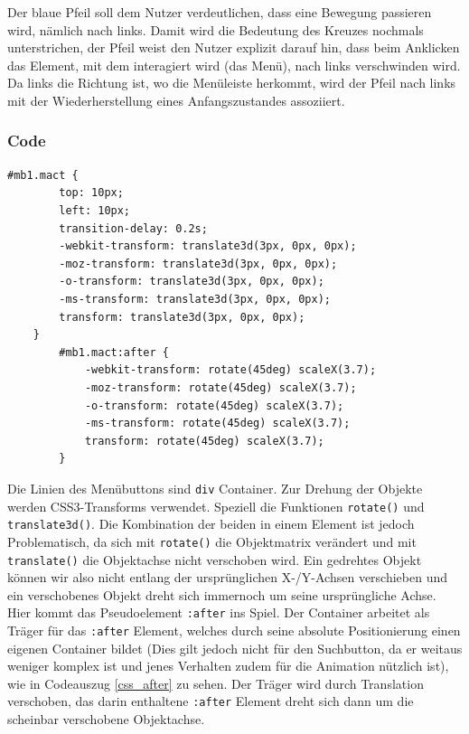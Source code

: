 Der blaue Pfeil soll dem Nutzer verdeutlichen, dass eine Bewegung passieren wird, nämlich nach links. Damit wird die Bedeutung des Kreuzes nochmals unterstrichen, der Pfeil weist den Nutzer explizit darauf hin, dass beim Anklicken das Element, mit dem interagiert wird (das Menü), nach links verschwinden wird. Da links die Richtung ist, wo die Menüleiste herkommt, wird der Pfeil nach links mit der Wiederherstellung eines Anfangszustandes assoziiert.


\subsubsection{Code}


\begin{lstlisting}[caption=Die Trennung von rotate() und translate()., label=css_after]
#mb1.mact {
        top: 10px;
        left: 10px;
        transition-delay: 0.2s;
        -webkit-transform: translate3d(3px, 0px, 0px);
        -moz-transform: translate3d(3px, 0px, 0px);
        -o-transform: translate3d(3px, 0px, 0px);
        -ms-transform: translate3d(3px, 0px, 0px);
        transform: translate3d(3px, 0px, 0px);
    }
        #mb1.mact:after {
            -webkit-transform: rotate(45deg) scaleX(3.7);
            -moz-transform: rotate(45deg) scaleX(3.7);
            -o-transform: rotate(45deg) scaleX(3.7);
            -ms-transform: rotate(45deg) scaleX(3.7);
            transform: rotate(45deg) scaleX(3.7);
        }
\end{lstlisting}

Die Linien des Menübuttons sind \lstinline{div} Container. Zur Drehung der Objekte werden CSS3-Transforms verwendet. Speziell die Funktionen \lstinline{rotate()} und \lstinline{translate3d()}. Die Kombination der beiden in einem Element ist jedoch Problematisch, da sich mit \lstinline{rotate()} die Objektmatrix verändert und mit \lstinline{translate()} die Objektachse nicht verschoben wird. Ein gedrehtes Objekt können wir also nicht entlang der ursprünglichen X-/Y-Achsen verschieben und ein verschobenes Objekt dreht sich immernoch um seine ursprüngliche Achse. Hier kommt das Pseudoelement \lstinline{:after} ins Spiel. Der Container arbeitet als Träger für das \lstinline{:after} Element, welches durch seine absolute Positionierung einen eigenen Container bildet (Dies gilt jedoch nicht für den Suchbutton, da er weitaus weniger komplex ist und jenes Verhalten zudem für die Animation nützlich ist), wie in Codeauszug \ref{css_after} zu sehen. Der Träger wird durch Translation verschoben, das darin enthaltene \lstinline{:after} Element dreht sich dann um die scheinbar verschobene Objektachse.


